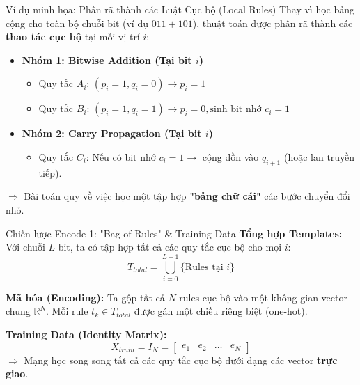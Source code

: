 \begin{frame}{Ví dụ minh họa: Phân rã thành các Luật Cục bộ (Local Rules)}
  Thay vì học bảng cộng cho toàn bộ chuỗi bit (ví dụ $011 + 101$), thuật toán được phân rã thành các \textbf{thao tác cục bộ} tại mỗi vị trí $i$:

  \begin{itemize}
    \item \textbf{Nhóm 1: Bitwise Addition (Tại bit $i$)}
      \begin{itemize}
        \item Quy tắc $A_i$: $(p_i=1, q_i=0) \to p_i=1$
        \item Quy tắc $B_i$: $(p_i=1, q_i=1) \to p_i=0, \text{sinh bit nhớ } c_i=1$
      \end{itemize}
    
    \item \textbf{Nhóm 2: Carry Propagation (Tại bit $i$)}
      \begin{itemize}
        \item Quy tắc $C_i$: Nếu có bit nhớ $c_i=1 \to$ cộng dồn vào $q_{i+1}$ (hoặc lan truyền tiếp).
      \end{itemize}
  \end{itemize}

  \vspace{0.2cm}
  $\Rightarrow$ Bài toán quy về việc học một tập hợp \textbf{"bảng chữ cái"} các bước chuyển đổi nhỏ.
\end{frame}

\begin{frame}{Chiến lược Encode 1: "Bag of Rules" & Training Data}
  \textbf{Tổng hợp Templates:}
  Với chuỗi $L$ bit, ta có tập hợp tất cả các quy tắc cục bộ cho mọi $i$:
  \[ T_{total} = \bigcup_{i=0}^{L-1} \{ \text{Rules tại } i \} \]

  \textbf{Mã hóa (Encoding):}
  Ta gộp tất cả $N$ rules cục bộ vào một không gian vector chung $\mathbb{R}^N$. Mỗi rule $t_k \in T_{total}$ được gán một chiều riêng biệt (one-hot).

  \textbf{Training Data (Identity Matrix):}
  \[
    X_{train} = I_N = 
    \begin{bmatrix}
    e_1 & e_2 & \dots & e_N
    \end{bmatrix}
  \]
  $\Rightarrow$ Mạng học song song tất cả các quy tắc cục bộ dưới dạng các vector \textbf{trực giao}.
\end{frame}

